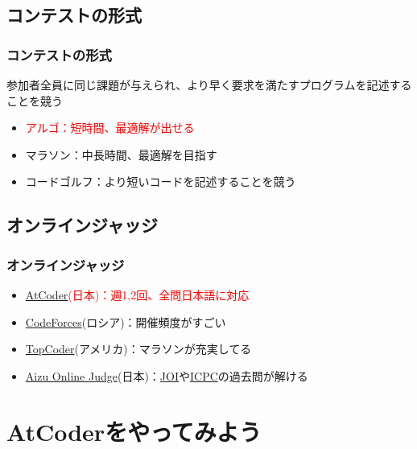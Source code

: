 \documentclass[t, aspectratio=169, dvipdfmx]{beamer}
\begin{document}
\subsection{コンテストの形式}
\begin{frame}
  \frametitle{コンテストの形式}
  参加者全員に同じ課題が与えられ、より早く要求を満たすプログラムを記述することを競う
  \begin{itemize}
    \item \textcolor{red}{アルゴ：短時間、最適解が出せる}
    \item マラソン：中長時間、最適解を目指す
    \item コードゴルフ：より短いコードを記述することを競う
  \end{itemize}
\end{frame}

\subsection{オンラインジャッジ}
\begin{frame}
  \frametitle{オンラインジャッジ}
  \begin{itemize}
    \item \textcolor{red}{\href{https://atcoder.jp/home}{AtCoder}(日本)：週1,2回、全問日本語に対応}
    \item \href{http://codeforces.com/}{CodeForces}(ロシア)：開催頻度がすごい
    \item \href{https://www.tc3.co.jp/topcodersrm/}{TopCoder}(アメリカ)：マラソンが充実してる
    \item \href{http://judge.u-aizu.ac.jp/onlinejudge/}{Aizu Online Judge}(日本)：\href{https://www.ioi-jp.org/}{JOI}や\href{https://icpc.iisf.or.jp/}{ICPC}の過去問が解ける
  \end{itemize}
\end{frame}

\section{AtCoderをやってみよう}
\frame{\sectionpage}
\end{document}
